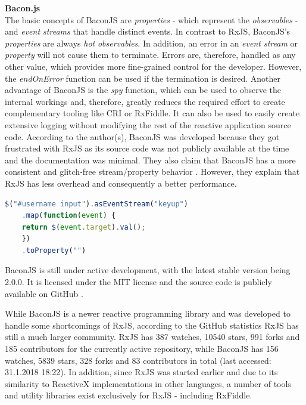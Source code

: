 	\textbf{Bacon.js}\\
	The basic concepts of BaconJS \cite{BaconJS} are \emph{properties} - which represent the \emph{observables} - and \emph{event streams} that handle distinct events. 
	In contrast to RxJS, BaconJS's \emph{properties} are always \emph{hot} \emph{observables}. In addition, an error in an \emph{event stream} or \emph{property} will not cause them to terminate. Errors are, therefore, handled as any other value, which provides more fine-grained control for the developer. However, the \emph{endOnError} function can be used if the termination is desired. 
	Another advantage of BaconJS is the \emph{spy} function, which can be used to observe the internal workings and, therefore, greatly reduces the required effort to create complementary tooling like CRI or RxFiddle. It can also be used to easily create extensive logging without modifying the rest of the reactive application source code. According to the author(s), BaconJS was developed because they got frustrated with RxJS as its source code was not publicly available at the time and the documentation was minimal. They also claim that BaconJS has a more consistent and glitch-free stream/property behavior \cite{BaconJSRepo}. However, they explain that RxJS has less overhead and consequently a better performance. 
		\begin{lstlisting}[language=JavaScript, caption={Example of BaconJS code.},label={lst:Bacon}]
	$("#username input").asEventStream("keyup")
	.map(function(event) {
	return $(event.target).val();
	})
	.toProperty("")
	\end{lstlisting}
	BaconJS is still under active development, with the latest stable version being 2.0.0. It is licensed under the MIT license and the source code is publicly available on GitHub \cite{BaconJSRepo}.

	While BaconJS is a newer reactive programming library and was developed to handle some shortcomings of RxJS, according to the GitHub statistics RxJS has still a much larger community. RxJS has 387 watches, 10540 stars, 991 forks and 185 contributors for the currently active repository, while BaconJS has 156 watches, 5839 stars, 328 forks and 83 contributors in total (last accessed: 31.1.2018 18:22).
	In addition, since RxJS was started earlier and due to its similarity to ReactiveX implementations in other languages, a number of tools and utility libraries exist exclusively for RxJS - including RxFiddle.

